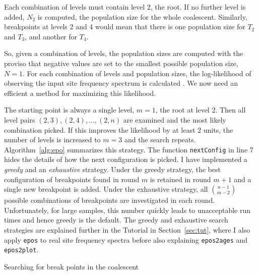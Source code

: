 \documentclass[a4paper, english]{article}
\newcommand{\ty}{\texttt}
\begin{document}
Each combination of levels must contain level 2, the root. If no
further level is added, $N_2$ is computed, the population size for the
whole coalescent. Similarly, breakpoints at levels 2 and 4 would mean
that there is one population size for $T_2$ and $T_3$, and another
for $T_4$.

So, given a combination of levels, the population sizes are computed
with the proviso that negative values are set to the smallest possible
population size, $N=1$. For each combination of levels and population
sizes, the log-likelihood of observing the input site frequency
spectrum is calculated \citep{lyn19:inf}. We now need an efficient a method
for maximizing this likelihood.

The starting point is always a single level, $m=1$, the root at level
2. Then all level pairs $(2,3), (2,4),...,(2,n)$ are examined and the
most likely combination picked. If this improves the likelihood by at
least 2 units, the number of levels is increased to $m=3$ and the
search repeats. Algorithm~\ref{alg:epo} summarizes this strategy. The
function \ty{nextConfig} in line 7 hides the details of how the next
configuration is picked. I have implemented a \emph{greedy} and an
\emph{exhaustive} strategy. Under the greedy strategy, the best
configuration of breakpoints found in round $m$ is retained in round
$m+1$ and a single new breakpoint is added. Under the exhaustive
strategy, all ${n-1\choose m-2}$ possible combinations of breakpoints
are investigated in each round. Unfortunately, for large samples, this
number quickly leads to unacceptable run times and hence greedy is the
default. The greedy and exhaustive search strategies are explained
further in the Tutorial in Section~\ref{sec:tut}, where I also apply
\ty{epos} to real site frequency spectra before also explaining
\ty{epos2ages} and \ty{epos2plot}.

\begin{algorithm}
  \caption{Searching for break points in the coalescent}\label{alg:epo}
  
\end{algorithm}
\end{document}
